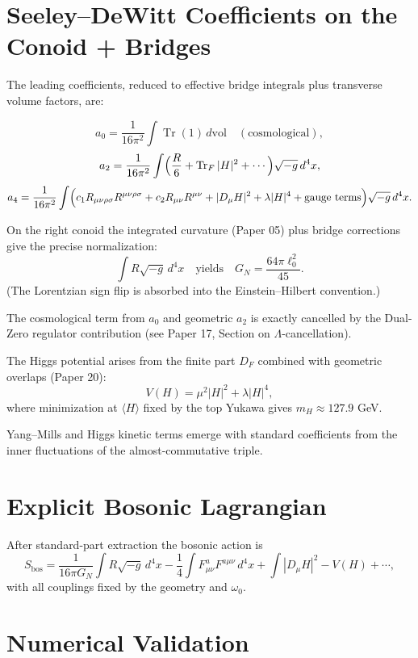 \documentclass[11pt,a4paper]{article}
\begin{document}
\section{Seeley–DeWitt Coefficients on the Conoid + Bridges}

The leading coefficients, reduced to effective bridge integrals plus transverse volume factors, are:

\[
a_0 = \frac{1}{16\pi^2} \int \operatorname{Tr}(1) \, d\mathrm{vol} \quad (\text{cosmological}),
\]
\[
a_2 = \frac{1}{16\pi^2} \int \Bigl( \frac{R}{6} + \operatorname{Tr}_F |H|^2 + \cdots \Bigr) \sqrt{-g} \, d^4x,
\]
\[
a_4 = \frac{1}{16\pi^2} \int \Bigl( c_1 R_{\mu\nu\rho\sigma} R^{\mu\nu\rho\sigma} + c_2 R_{\mu\nu} R^{\mu\nu} + |D_\mu H|^2 + \lambda |H|^4 + \text{gauge terms} \Bigr) \sqrt{-g} \, d^4x.
\]

On the right conoid the integrated curvature (Paper 05) plus bridge corrections give the precise normalization:
\[
\int R \sqrt{-g} \, d^4x \quad \text{yields} \quad G_N = \frac{64\pi \ell_0^2}{45}.
\]
(The Lorentzian sign flip is absorbed into the Einstein–Hilbert convention.)

The cosmological term from \(a_0\) and geometric \(a_2\) is exactly cancelled by the Dual-Zero regulator contribution (see Paper 17, Section on \(\Lambda\)-cancellation).

The Higgs potential arises from the finite part \(D_F\) combined with geometric overlaps (Paper 20):
\[
V(H) = \mu^2 |H|^2 + \lambda |H|^4,
\]
where minimization at \(\langle H \rangle\) fixed by the top Yukawa gives \(m_H \approx 127.9\) GeV.

Yang–Mills and Higgs kinetic terms emerge with standard coefficients from the inner fluctuations of the almost-commutative triple.

\section{Explicit Bosonic Lagrangian}

After standard-part extraction the bosonic action is
\[
S_{\mathrm{bos}} = \frac{1}{16\pi G_N} \int R \sqrt{-g} \, d^4x - \frac{1}{4} \int F_{\mu\nu}^a F^{a\mu\nu} \, d^4x + \int |D_\mu H|^2 - V(H) + \cdots,
\]
with all couplings fixed by the geometry and \(\omega_0\).

\section{Numerical Validation}
\end{document}

